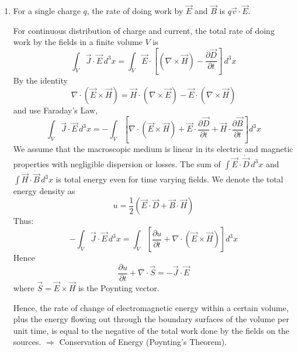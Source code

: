 \documentclass{article}
\begin{document}
	\begin{enumerate}
		\item For a single charge $q$, the rate of doing work by $\vec{E}$ and $\vec{B}$ is $q\vec{v} \cdot \vec{E}$.
		
		For continuous distribution of charge and current, the total rate of doing work by the fields in a finite volume $V$ is
		\[ \int_V \vec{J} \cdot \vec{E} \, d^3x = \int_V \vec{E} \cdot [(\nabla \times \vec{H}) - \frac{\partial \vec{D}}{\partial t}] \, d^3x \]
		By the identity
		\[ \nabla \cdot (\vec{E} \times \vec{H}) = \vec{H} \cdot (\nabla \times \vec{E}) - \vec{E} \cdot (\nabla \times \vec{H}) \]
		and use Faraday's Law,
		\[ \int_V \vec{J} \cdot \vec{E} \, d^3x = - \int_V \left[ \nabla \cdot (\vec{E} \times \vec{H}) + \vec{E} \cdot \frac{\partial \vec{D}}{\partial t} + \vec{H} \cdot \frac{\partial \vec{B}}{\partial t} \right] d^3x \]
		We assume that the macroscopic medium is linear in its electric and magnetic properties with negligible dispersion or losses. The sum of $\int \vec{E} \cdot \dot{\vec{D}} \, d^3x$ and $\int \vec{H} \cdot \dot{\vec{B}} \, d^3x$ is total energy even for time varying fields.
		We denote the total energy density as
		\[ u = \frac{1}{2}(\vec{E} \cdot \vec{D} + \vec{B} \cdot \vec{H}) \]
		Thus:
		\[ -\int_V \vec{J} \cdot \vec{E} \, d^3x = \int_V \left[ \frac{\partial u}{\partial t} + \nabla \cdot (\vec{E} \times \vec{H}) \right] d^3x \]
		Hence
		\[ \frac{\partial u}{\partial t} + \nabla \cdot \vec{S} = -\vec{J} \cdot \vec{E} \]
		where $\vec{S} = \vec{E} \times \vec{H}$ is the Poynting vector.
		
		Hence, the rate of change of electromagnetic energy within a certain volume, plus the energy flowing out through the boundary surfaces of the volume per unit time, is equal to the negative of the total work done by the fields on the sources.
		$\Rightarrow$ Conservation of Energy (Poynting's Theorem).
		

\end{enumerate}
\end{document}
